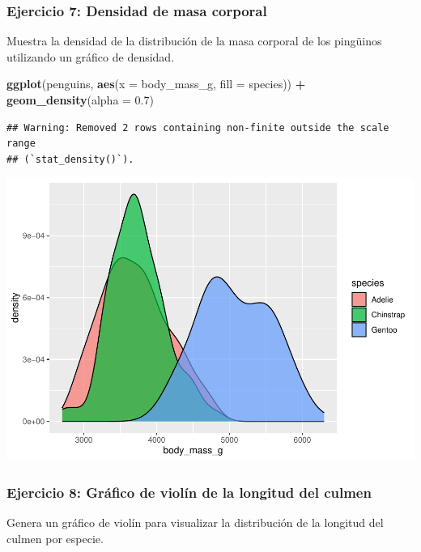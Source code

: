 \documentclass[
]{book}
\newenvironment{Shaded}{\begin{snugshade}}{\end{snugshade}}
\newcommand{\AttributeTok}[1]{\textcolor[rgb]{0.13,0.29,0.53}{#1}}
\newcommand{\FloatTok}[1]{\textcolor[rgb]{0.00,0.00,0.81}{#1}}
\newcommand{\FunctionTok}[1]{\textcolor[rgb]{0.13,0.29,0.53}{\textbf{#1}}}
\newcommand{\NormalTok}[1]{#1}
\newcommand{\SpecialCharTok}[1]{\textcolor[rgb]{0.81,0.36,0.00}{\textbf{#1}}}
\begin{document}
\subsubsection{Ejercicio 7: Densidad de masa corporal}\label{ejercicio-7-densidad-de-masa-corporal}

Muestra la densidad de la distribución de la masa corporal de los pingüinos utilizando un gráfico de densidad.

\begin{Shaded}
\begin{Highlighting}[]
\FunctionTok{ggplot}\NormalTok{(penguins, }\FunctionTok{aes}\NormalTok{(}\AttributeTok{x =}\NormalTok{ body\_mass\_g, }\AttributeTok{fill =}\NormalTok{ species)) }\SpecialCharTok{+}
  \FunctionTok{geom\_density}\NormalTok{(}\AttributeTok{alpha =} \FloatTok{0.7}\NormalTok{)}
\end{Highlighting}
\end{Shaded}

\begin{verbatim}
## Warning: Removed 2 rows containing non-finite outside the scale range
## (`stat_density()`).
\end{verbatim}

\includegraphics{bookdown-demo_files/figure-latex/unnamed-chunk-189-1.pdf}

\subsubsection{Ejercicio 8: Gráfico de violín de la longitud del culmen}\label{ejercicio-8-gruxe1fico-de-violuxedn-de-la-longitud-del-culmen}

Genera un gráfico de violín para visualizar la distribución de la longitud del culmen por especie.
\end{document}
